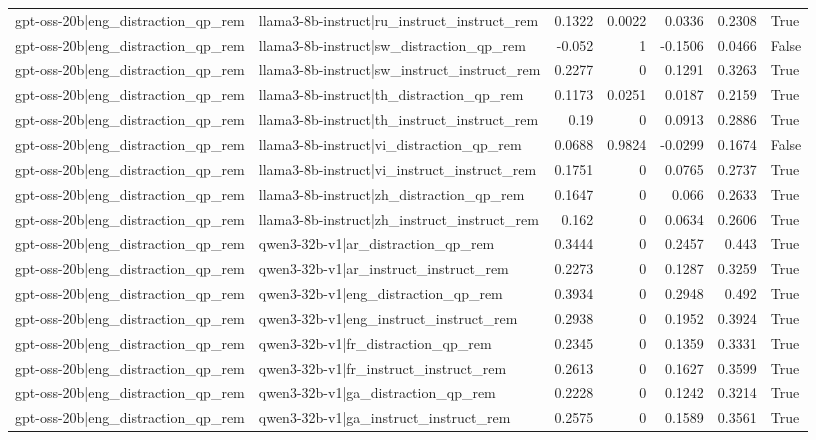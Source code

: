 \begin{table}
\begin{tabular}{l l r r r r l}
gpt-oss-20b|eng_distraction_qp_rem & llama3-8b-instruct|ru_instruct_instruct_rem & 0.1322 & 0.0022 & 0.0336 & 0.2308 & True \\
gpt-oss-20b|eng_distraction_qp_rem & llama3-8b-instruct|sw_distraction_qp_rem & -0.052 & 1 & -0.1506 & 0.0466 & False \\
gpt-oss-20b|eng_distraction_qp_rem & llama3-8b-instruct|sw_instruct_instruct_rem & 0.2277 & 0 & 0.1291 & 0.3263 & True \\
gpt-oss-20b|eng_distraction_qp_rem & llama3-8b-instruct|th_distraction_qp_rem & 0.1173 & 0.0251 & 0.0187 & 0.2159 & True \\
gpt-oss-20b|eng_distraction_qp_rem & llama3-8b-instruct|th_instruct_instruct_rem & 0.19 & 0 & 0.0913 & 0.2886 & True \\
gpt-oss-20b|eng_distraction_qp_rem & llama3-8b-instruct|vi_distraction_qp_rem & 0.0688 & 0.9824 & -0.0299 & 0.1674 & False \\
gpt-oss-20b|eng_distraction_qp_rem & llama3-8b-instruct|vi_instruct_instruct_rem & 0.1751 & 0 & 0.0765 & 0.2737 & True \\
gpt-oss-20b|eng_distraction_qp_rem & llama3-8b-instruct|zh_distraction_qp_rem & 0.1647 & 0 & 0.066 & 0.2633 & True \\
gpt-oss-20b|eng_distraction_qp_rem & llama3-8b-instruct|zh_instruct_instruct_rem & 0.162 & 0 & 0.0634 & 0.2606 & True \\
gpt-oss-20b|eng_distraction_qp_rem & qwen3-32b-v1|ar_distraction_qp_rem & 0.3444 & 0 & 0.2457 & 0.443 & True \\
gpt-oss-20b|eng_distraction_qp_rem & qwen3-32b-v1|ar_instruct_instruct_rem & 0.2273 & 0 & 0.1287 & 0.3259 & True \\
gpt-oss-20b|eng_distraction_qp_rem & qwen3-32b-v1|eng_distraction_qp_rem & 0.3934 & 0 & 0.2948 & 0.492 & True \\
gpt-oss-20b|eng_distraction_qp_rem & qwen3-32b-v1|eng_instruct_instruct_rem & 0.2938 & 0 & 0.1952 & 0.3924 & True \\
gpt-oss-20b|eng_distraction_qp_rem & qwen3-32b-v1|fr_distraction_qp_rem & 0.2345 & 0 & 0.1359 & 0.3331 & True \\
gpt-oss-20b|eng_distraction_qp_rem & qwen3-32b-v1|fr_instruct_instruct_rem & 0.2613 & 0 & 0.1627 & 0.3599 & True \\
gpt-oss-20b|eng_distraction_qp_rem & qwen3-32b-v1|ga_distraction_qp_rem & 0.2228 & 0 & 0.1242 & 0.3214 & True \\
gpt-oss-20b|eng_distraction_qp_rem & qwen3-32b-v1|ga_instruct_instruct_rem & 0.2575 & 0 & 0.1589 & 0.3561 & True \\

\end{tabular}
\end{table}
